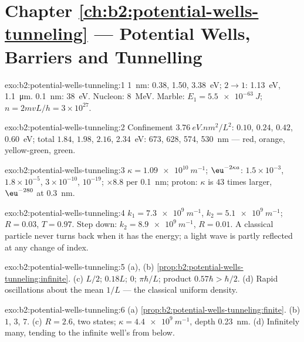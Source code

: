 \section*{Chapter \ref{ch:b2:potential-wells-tunneling} --- Potential Wells, Barriers and Tunnelling}

\begin{solution}{exo:b2:potential-wells-tunneling:1}
\qty{1}{nm}: \qty{0.38}{}, \qty{1.50}{}, \qty{3.38}{eV}; $2 \to 1$: \qty{1.13}{eV}, \qty{1.1}{\micro m}.
\qty{0.1}{nm}: \qty{38}{eV}. Nucleon: \qty{8}{MeV}. Marble: $E_1 = \qty{5.5e-63}{J}$;
$n = 2mvL/h = 3 \times 10^{27}$.
\end{solution}

\begin{solution}{exo:b2:potential-wells-tunneling:2}
Confinement $\qty{3.76}{eV.nm^2}/L^2$: $0.10$, $0.24$, $0.42$, \qty{0.60}{eV}; total
$1.84$, $1.98$, $2.16$, \qty{2.34}{eV}: \qty{673}{}, \qty{628}{}, \qty{574}{}, \qty{530}{nm} ---
red, orange, yellow-green, green.
\end{solution}

\begin{solution}{exo:b2:potential-wells-tunneling:3}
$\kappa = \qty{1.09e10}{m^{-1}}$; $\eu^{-2\kappa a}$: $1.5 \times 10^{-3}$, $1.8 \times 10^{-5}$,
$3 \times 10^{-10}$, $10^{-19}$; $\times 8.8$ per \qty{0.1}{nm}; proton: $\kappa$ is
$43$ times larger, $\eu^{-280}$ at \qty{0.3}{nm}.
\end{solution}

\begin{solution}{exo:b2:potential-wells-tunneling:4}
$k_1 = \qty{7.3e9}{m^{-1}}$, $k_2 = \qty{5.1e9}{m^{-1}}$; $R = 0.03$, $T = 0.97$. Step
down: $k_2 = \qty{8.9e9}{m^{-1}}$, $R = 0.01$. A classical particle never
turns back when it has the energy; a light wave is partly reflected
at any change of index.
\end{solution}

\begin{solution}{exo:b2:potential-wells-tunneling:5}
(a), (b) \cref{prop:b2:potential-wells-tunneling:infinite}. (c) $L/2$;
$0.18L$; $0$; $\pi\hbar/L$; product $0.57\hbar > \hbar/2$. (d) Rapid
oscillations about the mean $1/L$ --- the classical uniform density.
\end{solution}

\begin{solution}{exo:b2:potential-wells-tunneling:6}
(a) \cref{prop:b2:potential-wells-tunneling:finite}. (b) $1$, $3$, $7$.
(c) $R = 2.6$, two states; $\kappa = \qty{4.4e9}{m^{-1}}$, depth \qty{0.23}{nm}. (d)
Infinitely many, tending to the infinite well's from below.
\end{solution}

